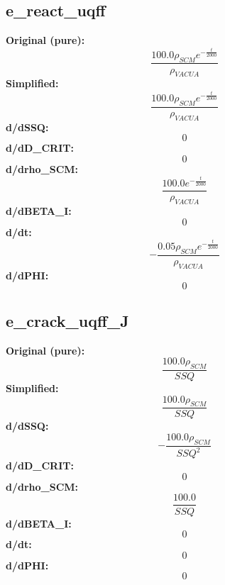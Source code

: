 \subsection{e_react_uqff}
\textbf{Original (pure):}
\begin{equation}
\frac{100.0 \rho_{SCM} e^{- \frac{t}{2000}}}{\rho_{VAC UA}}
\end{equation}
\textbf{Simplified:}
\begin{equation}
\frac{100.0 \rho_{SCM} e^{- \frac{t}{2000}}}{\rho_{VAC UA}}
\end{equation}
\textbf{d/dSSQ:}
\begin{equation}
0
\end{equation}
\textbf{d/dD_CRIT:}
\begin{equation}
0
\end{equation}
\textbf{d/drho_SCM:}
\begin{equation}
\frac{100.0 e^{- \frac{t}{2000}}}{\rho_{VAC UA}}
\end{equation}
\textbf{d/dBETA_I:}
\begin{equation}
0
\end{equation}
\textbf{d/dt:}
\begin{equation}
- \frac{0.05 \rho_{SCM} e^{- \frac{t}{2000}}}{\rho_{VAC UA}}
\end{equation}
\textbf{d/dPHI:}
\begin{equation}
0
\end{equation}

\subsection{e_crack_uqff_J}
\textbf{Original (pure):}
\begin{equation}
\frac{100.0 \rho_{SCM}}{SSQ}
\end{equation}
\textbf{Simplified:}
\begin{equation}
\frac{100.0 \rho_{SCM}}{SSQ}
\end{equation}
\textbf{d/dSSQ:}
\begin{equation}
- \frac{100.0 \rho_{SCM}}{SSQ^{2}}
\end{equation}
\textbf{d/dD_CRIT:}
\begin{equation}
0
\end{equation}
\textbf{d/drho_SCM:}
\begin{equation}
\frac{100.0}{SSQ}
\end{equation}
\textbf{d/dBETA_I:}
\begin{equation}
0
\end{equation}
\textbf{d/dt:}
\begin{equation}
0
\end{equation}
\textbf{d/dPHI:}
\begin{equation}
0
\end{equation}

